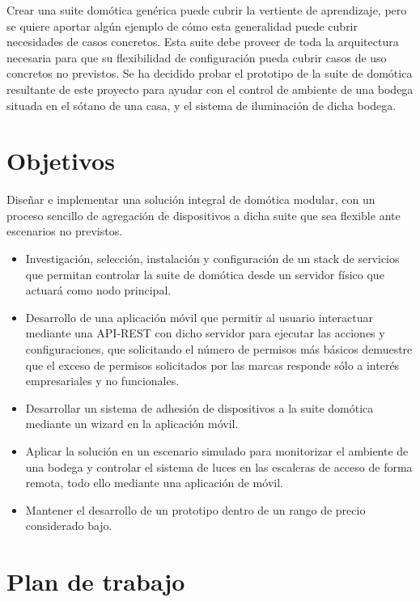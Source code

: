 \vspace{1cm}

Crear una suite domótica genérica puede cubrir la vertiente de aprendizaje, pero se quiere aportar algún ejemplo de cómo esta generalidad puede cubrir necesidades de casos concretos. Esta suite debe proveer de toda la arquitectura necesaria para que su flexibilidad de configuración pueda cubrir casos de uso concretos no previstos. Se ha decidido probar el prototipo de la suite de domótica resultante de este proyecto para ayudar con el control de ambiente de una bodega situada en el sótano de una casa, y el sistema de iluminación de dicha bodega.

\section{Objetivos}
\label{ch:Capitulo1.1}

Diseñar e implementar una solución integral de domótica modular, con un proceso sencillo de agregación de dispositivos a dicha suite que sea flexible ante escenarios no previstos.
\begin{itemize}
  \item Investigación, selección, instalación y configuración de un stack de servicios que permitan controlar la suite de domótica desde un servidor físico que actuará como nodo principal.

  \item Desarrollo de una aplicación móvil que permitir al usuario interactuar mediante una API-REST con dicho servidor para ejecutar las acciones y configuraciones, que solicitando el número de permisos más básicos demuestre que el exceso de permisos solicitados por las marcas responde sólo a interés empresariales y no funcionales.

  \item Desarrollar un sistema de adhesión de dispositivos a la suite domótica mediante un \gls{wizard} en la aplicación móvil.
  
  \item Aplicar la solución en un escenario simulado para monitorizar el ambiente de una bodega y controlar el sistema de luces en las escaleras de acceso de forma remota, todo ello mediante una aplicación de móvil.
  
  \item Mantener el desarrollo de un prototipo dentro de un rango de precio considerado bajo.
\end{itemize}

\section{Plan de trabajo}
\label{ch:Capitulo1.2}

